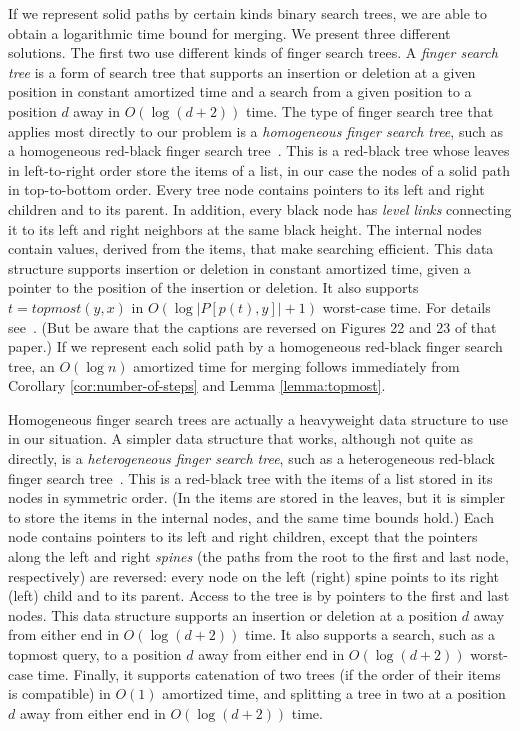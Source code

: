 \documentclass[twoside,leqno,twocolumn]{article}
\begin{document}
If we represent solid paths by certain kinds binary search trees, we are able to obtain a logarithmic time bound for merging.  We present three different solutions.  The first two use different kinds of finger search trees.  A \emph{finger search tree} is a form of search tree that supports an insertion or deletion at a given position in constant amortized time and a search from a given position to a position $d$ away in $O(\log(d + 2))$ time.  The type of finger search tree that applies most directly to our problem is a \emph{homogeneous finger search tree}, such as a homogeneous red-black finger search tree~\cite{finger_trees:tvw88}.  This is a red-black tree whose leaves in left-to-right order store the items of a list, in our case the nodes of a solid path in top-to-bottom order.  Every tree node contains pointers to its left and right children and to its parent.  In addition, every black node has \emph{level links} connecting it to its left and right neighbors at the same black height.  The internal nodes contain values, derived from the items, that make searching efficient.  This data structure supports insertion or deletion in constant amortized time, given a pointer to the position of the insertion or deletion.  It also supports $t = \mathit{topmost}(y, x)$ in $O(\log|P[p(t), y]| + 1)$ worst-case time.  For details see~\cite{finger_trees:tvw88}.  (But be aware that the captions are reversed on Figures 22 and 23 of that paper.)  If  we represent each solid path by a homogeneous red-black finger search tree, an $O(\log n)$ amortized time for merging follows immediately from Corollary \ref{cor:number-of-steps} and Lemma \ref{lemma:topmost}.

Homogeneous finger search trees are actually a heavyweight data structure to use in our situation.  A simpler data structure that works, although not quite as directly, is a \emph{heterogeneous finger search tree}, such as a heterogeneous red-black finger search tree~\cite{finger_trees:tvw88}.  This is a red-black tree with the items of a list stored in its nodes in symmetric order.  (In \cite{finger_trees:tvw88} the items are stored in the leaves, but it is simpler to store the items in the internal nodes, and the same time bounds hold.)  Each node contains pointers to its left and right children, except that the pointers along the left and right \emph{spines} (the paths from the root to the first and last node, respectively) are reversed: every node on the left (right) spine points to its right (left) child and to its parent.  Access to the tree is by pointers to the first and last nodes.  This data structure supports an insertion or deletion at a position $d$ away from either end in $O(\log(d + 2))$ time.  It also supports a search, such as a topmost query, to a position $d$ away from either end in $O(\log(d + 2))$ worst-case time.  Finally, it supports catenation of two trees (if the order of their items is compatible) in $O(1)$ amortized time, and splitting a tree in two at a position $d$ away from either end in $O(\log(d + 2))$ time.
\end{document}
